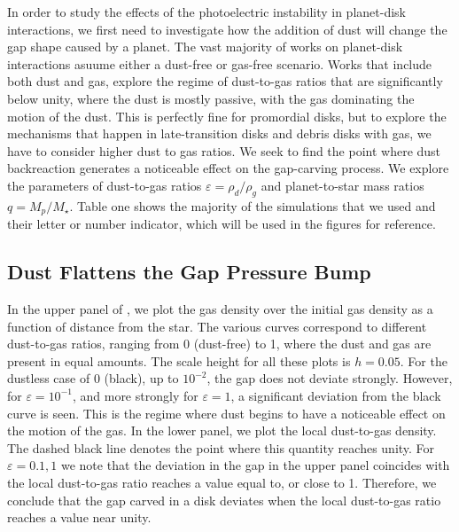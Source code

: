 \documentclass[onecolumn]{report}
\newcommand{\epsi}{\varepsilon}
\begin{document}
In order to study the effects of the photoelectric instability in planet-disk interactions, we first need to investigate how the addition of dust will change the gap shape caused by a planet. The vast majority of works on planet-disk interactions asuume either a dust-free or gas-free scenario. Works that include both dust and gas, explore the regime of dust-to-gas ratios that are significantly below unity, where the dust is mostly passive, with the gas dominating the motion of the dust. This is perfectly fine for promordial disks, but to explore the mechanisms that happen in late-transition disks and debris disks with gas, we have to consider higher dust to gas ratios. We seek to find the point where dust backreaction generates a noticeable effect on the gap-carving process. We explore the parameters of dust-to-gas ratios $\epsi=\rho_d / \rho_g$ and planet-to-star mass ratios $q=M_p / M_\star$. Table one shows the majority of the simulations that we used and their letter or number indicator, which will be used in the figures for reference.  

\subsection{Dust Flattens the Gap Pressure Bump} \label{section:flattening}

In the upper panel of , we plot the gas density over the initial gas density as a function of distance from the star. The various curves correspond to different dust-to-gas ratios, ranging from 0 (dust-free) to 1, where the dust and gas are present in equal amounts. The scale height for all these plots is $h=0.05$. For the dustless case of 0 (black), up to $10^{-2}$, the gap does not deviate strongly. However, for $\varepsilon=10^{-1}$, and more strongly for $\varepsilon=1$, a significant deviation from the black curve is seen. This is the regime where dust begins to have a noticeable effect on the motion of the gas. In the lower panel, we plot the local dust-to-gas density. The dashed black line denotes the point where this quantity reaches unity. For $\varepsilon=0.1,1$ we note that the deviation in the gap in the upper panel coincides with the local dust-to-gas ratio reaches a value equal to, or close to 1. Therefore, we conclude that the gap carved in a disk deviates when the local dust-to-gas ratio reaches a value near unity.
\end{document}
